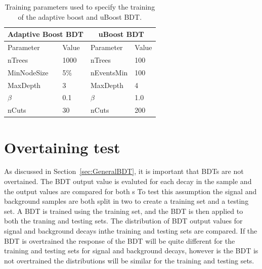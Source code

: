 \begin{table}[htbp]
\begin{center}
\begin{tabular}{ll|ll}
\hline
\multicolumn{2}{c}{Adaptive Boost BDT} & \multicolumn{2}{c}{uBoost BDT} \\ \hline
Parameter & Value & Parameter & Value\\ \hline
nTrees & 1000 &  nTrees & 100\\
MinNodeSize & 5$\%$ & nEventsMin & 100 \\
MaxDepth & 3 & MaxDepth & 4 \\
$\beta$ & 0.1 & $\beta$ & 1.0 \\
nCuts & 30 & nCuts & 200 \\
\hline
\end{tabular}
\vspace{0.7cm}
\caption{Training parameters used to specify the training of the adaptive boost and uBoost BDT.}
\label{tab:ELtrainingparamss}
\end{center}
\vspace{-1.0cm}
\end{table}


\section{Overtaining test}
As discussed in Section~\ref{sec:GeneralBDT}, it is important that BDTs are not overtained. %
The BDT output value is evaluted for each decay in the sample and the output values are compared for both s
To test this assumption the signal and background samples are both split in two to create a training set and a testing set.
A BDT is trained using the training set, and the BDT is then applied to both the traning and testing sets. The distribution of BDT output values for signal and background decays inthe training and testing sets are compared. If the BDT is overtrained the response of the BDT will be quite different for the training and testing sets for signal and background decays, however is the BDT is not overtrained the distributions will be similar for the training and testing sets. 


